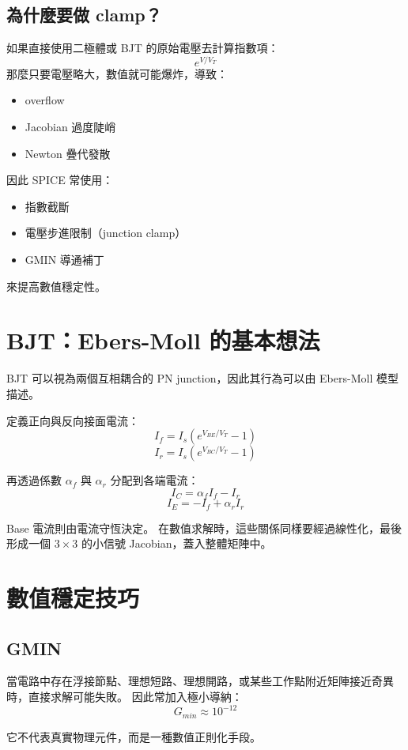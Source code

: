 \documentclass[12pt,a4paper]{article}
\begin{document}
\subsection{為什麼要做 clamp？}

如果直接使用二極體或 BJT 的原始電壓去計算指數項：
\[
e^{V/V_T}
\]
那麼只要電壓略大，數值就可能爆炸，導致：
\begin{itemize}
\item overflow
\item Jacobian 過度陡峭
\item Newton 疊代發散
\end{itemize}

因此 SPICE 常使用：
\begin{itemize}
\item 指數截斷
\item 電壓步進限制（junction clamp）
\item GMIN 導通補丁
\end{itemize}

來提高數值穩定性。

\section{BJT：Ebers-Moll 的基本想法}

BJT 可以視為兩個互相耦合的 PN junction，因此其行為可以由 Ebers-Moll 模型描述。

定義正向與反向接面電流：
\[
I_f = I_s \left(e^{V_{BE}/V_T} - 1\right)
\]
\[
I_r = I_s \left(e^{V_{BC}/V_T} - 1\right)
\]

再透過係數 $\alpha_f$ 與 $\alpha_r$ 分配到各端電流：
\[
I_C = \alpha_f I_f - I_r
\]
\[
I_E = -I_f + \alpha_r I_r
\]

Base 電流則由電流守恆決定。  
在數值求解時，這些關係同樣要經過線性化，最後形成一個 $3 \times 3$ 的小信號 Jacobian，蓋入整體矩陣中。

\section{數值穩定技巧}

\subsection{GMIN}

當電路中存在浮接節點、理想短路、理想開路，或某些工作點附近矩陣接近奇異時，直接求解可能失敗。  
因此常加入極小導納：
\[
G_{min} \approx 10^{-12}
\]

它不代表真實物理元件，而是一種數值正則化手段。
\end{document}
